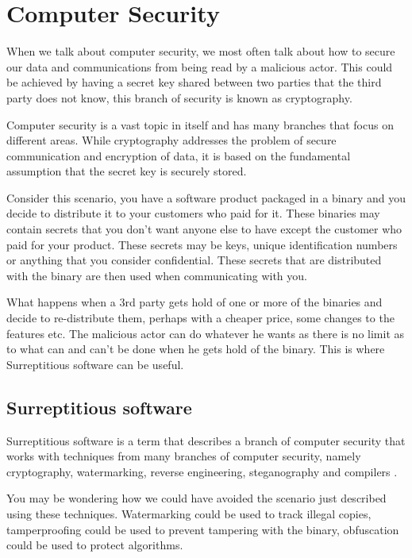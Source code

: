 \section{Computer Security}

When we talk about computer security, we most often talk about how to secure our data and communications from being read by a malicious actor.
This could be achieved by having a secret key shared between two parties that the third party does not know, this branch of security is known as cryptography.

Computer security is a vast topic in itself and has many branches that focus on different areas.
While cryptography addresses the problem of secure communication and encryption of data, 
it is based on the fundamental assumption that the secret key is securely stored.

Consider this scenario, you have a software product packaged in a binary and you decide to distribute it to 
your customers who paid for it. These binaries may contain secrets that you don't want anyone else
to have except the customer who paid for your product. These secrets may be keys, unique identification
numbers or anything that you consider confidential. These secrets that are distributed with the binary
are then used when communicating with you.

What happens when a 3rd party gets hold of one or more of the binaries and decide to re-distribute
them, perhaps with a cheaper price, some changes to the features etc. The malicious actor can do whatever
he wants as there is no limit as to what can and can't be done when he gets hold of the binary. This is 
where Surreptitious software can be useful.

\subsection{Surreptitious software}

Surreptitious software is a term that describes a branch of computer security that works with techniques
from many branches of computer security, namely cryptography, watermarking, reverse engineering, steganography
and compilers \cite{serr-soft}.

You may be wondering how we could have avoided the scenario just described using these techniques.
Watermarking could be used to track illegal copies, tamperproofing could be used to prevent tampering with the binary,
obfuscation could be used to protect algorithms.

